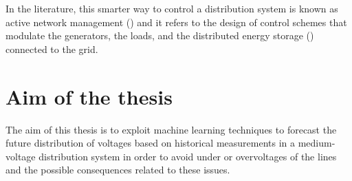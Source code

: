 In the literature, this smarter way to control a distribution system is known as active network management () and it refers to the design of control schemes that modulate the generators, the loads, and the distributed energy storage () connected to the grid. \\


\section{Aim of the thesis}
The aim of this thesis is to exploit machine learning techniques to forecast the future distribution of voltages based on historical measurements in a medium-voltage distribution system in order to avoid under or overvoltages of the lines and the possible consequences related to these issues. 



